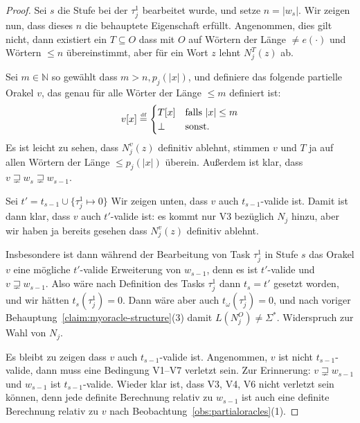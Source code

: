 \begin{proof}
    Sei $s$ die Stufe bei der $\tau^1_j$ bearbeitet wurde, 
    und setze $n=|w_{s}|$.
    Wir zeigen nun, dass dieses $n$ die behauptete Eigenschaft erfüllt.
    Angenommen, dies gilt nicht, dann existiert ein $T\subseteq O$ dass mit $O$ auf Wörtern der Länge $\neq e(\cdot)$ und Wörtern $\leq n$ übereinstimmt, aber für ein Wort $z$ lehnt $N_j^T(z)$ ab.

    Sei $m\in\mathbb N$ so gewählt dass $m> n, p_j(|x|)$, und definiere das folgende partielle Orakel $v$, das genau für alle Wörter der Länge $\leq m$ definiert ist:
    \[ v[x] \stackrel{\text{\smash{\tiny df}}}{=} \begin{cases} T[x] & \text{falls $|x|\leq m$} \\ \bot & \text{sonst}. \end{cases}\]
    Es ist leicht zu sehen, dass $N_j^v(z)$ definitiv ablehnt, stimmen $v$ und $T$ ja auf allen Wörtern der Länge $\leq p_j(|x|)$ überein.
    Außerdem ist klar, dass $v\sqsupsetneq w_s \sqsupsetneq w_{s-1}$.

    Sei $t'=t_{s-1}\cup \{\tau^1_j\mapsto 0\}$
    Wir zeigen unten, dass $v$ auch $t_{s-1}$-valide ist. Damit ist dann klar,
    dass $v$ auch $t'$-valide ist: es kommt nur V3 bezüglich $N_j$ hinzu, aber wir haben ja bereits gesehen dass $N_j^v(z)$ definitiv ablehnt.

    Insbesondere ist dann während der Bearbeitung von Task $\tau^1_{j}$ in Stufe $s$ das Orakel $v$ eine mögliche $t'$-valide Erweiterung von $w_{s-1}$, denn es ist $t'$-valide und $v\sqsupsetneq w_{s-1}$. Also wäre nach Definition des Tasks $\tau^1_{j}$ dann $t_{s}=t'$ gesetzt worden,
    und wir hätten $t_s(\tau^1_j)=0$.
    Dann wäre aber auch $t_\omega(\tau^1_j)=0$, und nach voriger Behauptung~\ref{claim:myoracle-structure}(3) damit $L(N_j^O)\neq\Sigma^*$. Widerspruch zur Wahl von $N_j$.

    Es bleibt zu zeigen dass $v$ auch $t_{s-1}$-valide ist. Angenommen, $v$ ist nicht $t_{s-1}$-valide, dann muss eine Bedingung V1--V7 verletzt sein. Zur Erinnerung: $v\sqsupsetneq w_{s-1}$ und $w_{s-1}$ ist $t_{s-1}$-valide.
    Wieder klar ist, dass V3, V4, V6 nicht verletzt sein können, denn jede definite Berechnung relativ zu $w_{s-1}$ ist auch eine definite Berechnung relativ zu $v$ nach Beobachtung~\ref{obs:partialoracles}(1).


\end{proof}
